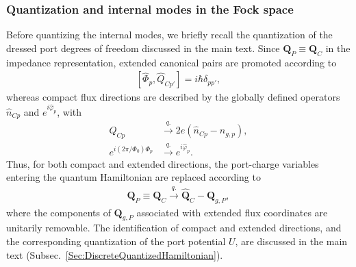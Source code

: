\documentclass[prx,aps,twocolumn,article]{revtex4-2}
\newcommand{\bsb}[1]{\boldsymbol{#1}}
\newcommand{\bQ}{\bsb{Q}}
\begin{document}
\subsubsection{Quantization and internal modes in the Fock space}
\label{AppSubsubsec:Quantization_Fock_Z}


Before quantizing the internal modes, we briefly recall the
quantization of the dressed port degrees of freedom discussed in the
main text. Since $\bQ_P\equiv\bQ_C$ in the impedance representation,
extended canonical pairs are promoted according to
\begin{align}
    \left[
        \hat{\Phi}_p,
        \hat{Q}_{Cp'}
    \right]
    =
    i\hbar\delta_{pp'},
\end{align}
whereas compact flux directions are described by the globally defined
operators $\hat n_{Cp}$ and $e^{i\hat{\varphi}_p}$, with
\begin{align}
    Q_{Cp}
    &\overset{q.}{\longrightarrow}
    2e
    \left(
        \hat n_{Cp}-n_{g,p}
    \right),
    \nonumber\\
    e^{i(2\pi/\Phi_0)\Phi_p}
    &\overset{q.}{\longrightarrow}
    e^{i\hat{\varphi}_p}.
\end{align}
Thus, for both compact and extended directions, the port-charge
variables entering the quantum Hamiltonian are replaced according to
\begin{align}
    \bQ_P
    \equiv
    \bQ_C
    \overset{q.}{\longrightarrow}
    \hat{\bQ}_C-\bQ_{g,P},
    \label{Eq:PortChargeQuantizationZ}
\end{align}
where the components of $\bQ_{g,P}$ associated with extended flux
coordinates are unitarily removable. The identification of compact
and extended directions, and the corresponding quantization of the
port potential $U$, are discussed in the main text (Subsec.~\ref{Sec:DiscreteQuantizedHamiltonian}).
\end{document}

